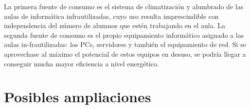 La primera fuente de consumo es el sistema de climatizaci\'on y alumbrado de las aulas de inform\'atica infrautilizadas, cuyo uso resulta imprescindible con independencia del n\'umero de alumnos que est\'en trabajando en el aula. La segunda fuente de consumo es el propio equipamiento inform\'atico asignado a las aulas in-frautilizadas: los PCs, servidores y tambi\'en el equipamiento de red. Si se aprovechase al m\'aximo el potencial de estos equipos en desuso, se podr\'ia llegar a conseguir mucha mayor eficiencia a nivel energ\'etico.


\section{Posibles ampliaciones}








